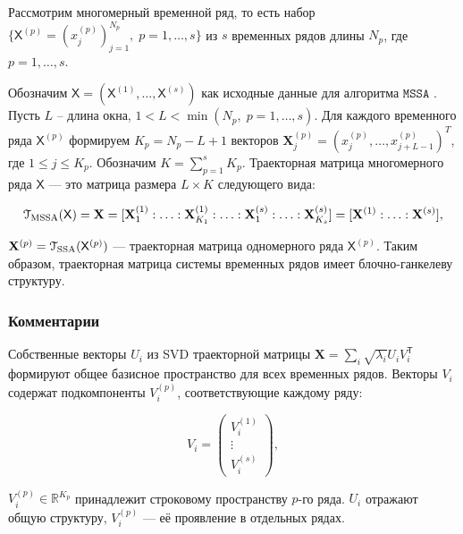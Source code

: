 \documentclass[12pt, specialist, subf
]{disser}
\theoremstyle{definition}
\newcommand{\MSSA}{\texttt{MSSA}}
\newcommand{\TS}{\mathsf{X}}
\begin{document}
Рассмотрим многомерный временной ряд, то есть набор $\{\TS^{(p)} = \left({x^{(p)}_{j}}\right) _{j=1}^{N_p}, \; p = 1, \ldots, s\}$ из $s$ временных рядов длины $N_p$, где $p = 1, \ldots, s$.

Обозначим $\TS = (\TS^{(1)}, \ldots, \TS^{(s)})$ как исходные данные для алгоритма $\MSSA$ \cite{ssa_with_R}. Пусть $L$ -- длина окна, $1 < L < \min(N_p, \; p = 1, \ldots, s)$. Для каждого временного ряда $\TS^{(p)}$ формируем $K_p = N_p - L + 1$ векторов $\mathbf{X}_j^{(p)} = (x_j^{(p)}, \ldots, x_{j+L-1}^{(p)})^T$, где $1 \leq j \leq K_p$. Обозначим $K = \sum_{p=1}^s K_p$. Траекторная матрица многомерного ряда $\TS$ — это матрица размера $L \times K$ следующего вида:

\[
	\EuScript{T}_{\text{MSSA}}(\TS) = \mathbf{X} = [\mathbf{X}_1^{(1)} : \ldots : \mathbf{X}_{K_1}^{(1)} : \ldots : \mathbf{X}_1^{(s)} : \ldots : \mathbf{X}_{K_s}^{(s)}] = [\mathbf{X}^{(1)} : \ldots : \mathbf{X}^{(s)}],
\]

$\mathbf{X}^{(p)} = \EuScript{T}_{\text{SSA}}(\TS^{(p)})$ — траекторная матрица одномерного ряда $\TS^{(p)}$. Таким образом, траекторная матрица системы временных рядов имеет блочно-ганкелеву структуру.




\subsubsection{Комментарии}


Собственные векторы $U_i$ из SVD траекторной матрицы $\mathbf{X} = \sum_i \sqrt{\lambda_i} U_i V_i^{\mathsf{T}}$ формируют общее базисное пространство для всех временных рядов. Векторы $V_i$ содержат подкомпоненты $V_i^{(p)}$, соответствующие каждому ряду:

\begin{equation*}
	V_i = \begin{pmatrix} V_i^{(1)} \\ \vdots \\ V_i^{(s)} \end{pmatrix},
\end{equation*}

$V_i^{(p)} \in \mathbb{R}^{K_p}$ принадлежит строковому пространству $p$-го ряда. $U_i$ отражают общую структуру, $V_i^{(p)}$ — её проявление в отдельных рядах.
\end{document}
